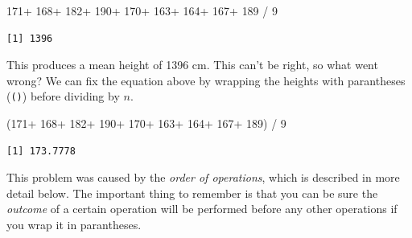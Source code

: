 \documentclass[
  letterpaper,
  DIV=11,
  numbers=noendperiod]{scrartcl}
\newenvironment{Shaded}{\begin{snugshade}}{\end{snugshade}}
\newcommand{\DecValTok}[1]{\textcolor[rgb]{0.68,0.00,0.00}{#1}}
\newcommand{\NormalTok}[1]{\textcolor[rgb]{0.00,0.23,0.31}{#1}}
\newcommand{\SpecialCharTok}[1]{\textcolor[rgb]{0.37,0.37,0.37}{#1}}
\begin{document}
\begin{Shaded}
\begin{Highlighting}[]
\DecValTok{171}\SpecialCharTok{+} \DecValTok{168}\SpecialCharTok{+} \DecValTok{182}\SpecialCharTok{+} \DecValTok{190}\SpecialCharTok{+} \DecValTok{170}\SpecialCharTok{+} \DecValTok{163}\SpecialCharTok{+} \DecValTok{164}\SpecialCharTok{+} \DecValTok{167}\SpecialCharTok{+} \DecValTok{189} \SpecialCharTok{/} \DecValTok{9}
\end{Highlighting}
\end{Shaded}

\begin{verbatim}
[1] 1396
\end{verbatim}

This produces a mean height of 1396 cm. This can't be right, so what
went wrong? We can fix the equation above by wrapping the heights with
parantheses (\texttt{()}) before dividing by \(n\).

\begin{Shaded}
\begin{Highlighting}[]
\NormalTok{(}\DecValTok{171}\SpecialCharTok{+} \DecValTok{168}\SpecialCharTok{+} \DecValTok{182}\SpecialCharTok{+} \DecValTok{190}\SpecialCharTok{+} \DecValTok{170}\SpecialCharTok{+} \DecValTok{163}\SpecialCharTok{+} \DecValTok{164}\SpecialCharTok{+} \DecValTok{167}\SpecialCharTok{+} \DecValTok{189}\NormalTok{) }\SpecialCharTok{/} \DecValTok{9}
\end{Highlighting}
\end{Shaded}

\begin{verbatim}
[1] 173.7778
\end{verbatim}

This problem was caused by the \emph{order of operations}, which is
described in more detail below. The important thing to remember is that
you can be sure the \emph{outcome} of a certain operation will be
performed before any other operations if you wrap it in parantheses.
\end{document}
